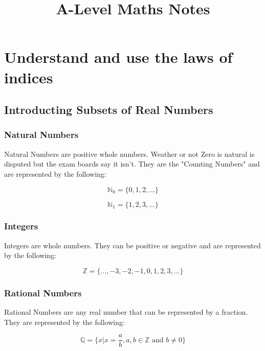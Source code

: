 \documentclass{article}
\begin{document}
\title{A-Level Maths Notes}
\maketitle

\section{Understand and use the laws of indices}

\subsection{Introducting Subsets of Real Numbers}

\subsubsection{Natural Numbers}
Natural Numbers are positive whole numbers. Weather or not Zero is natural
is disputed but the exam boards say it isn't. They are the "Counting Numbers"
 and are represented by the following:

\begin{equation}
    \label{simple_equation}
    \mathbb{N}_0 = \{0, 1, 2, \dots\}
\end{equation}

\begin{equation}
	\label{simple_equation}
    \mathbb{N}_1 = \{1, 2, 3, \dots\}
\end{equation}

\subsubsection{Integers}
Integers are whole numbers. They can be positive or negative  and are represented by the following:

\begin{equation}
    \label{simple_equation}
    \mathbb{Z} = \{\dots, -3, -2, -1, 0, 1, 2, 3, \dots\}
\end{equation}

\subsubsection{Rational Numbers}
Rational Numbers are any real number that can be represented by a fraction. They are represented by the following:

\begin{equation}
	\label{simple_equation}
	\mathbb{Q} = \{ x | x = \frac{a}{b}, a,b \in \mathbb{Z} \text{ and } b \ne 0 \}
\end{equation}
\end{document}
